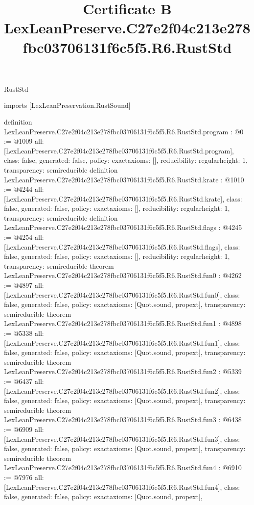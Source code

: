 \begin{lexlean}{RustStd}
\title{Certificate B LexLeanPreserve.C27e2f04c213e278fbc03706131f6c5f5.R6.RustStd}
\begin{coremodule}
imports [LexLeanPreservation.RustSound]

definition LexLeanPreserve.C27e2f04c213e278fbc03706131f6c5f5.R6.RustStd.program : @0 := @1009 {
  all: [LexLeanPreserve.C27e2f04c213e278fbc03706131f6c5f5.R6.RustStd.program],
  class: false,
  generated: false,
  policy: exact{axioms: []},
  reducibility: regular{height: 1},
  transparency: semireducible
}
definition LexLeanPreserve.C27e2f04c213e278fbc03706131f6c5f5.R6.RustStd.krate : @1010 := @4244 {
  all: [LexLeanPreserve.C27e2f04c213e278fbc03706131f6c5f5.R6.RustStd.krate],
  class: false,
  generated: false,
  policy: exact{axioms: []},
  reducibility: regular{height: 1},
  transparency: semireducible
}
definition LexLeanPreserve.C27e2f04c213e278fbc03706131f6c5f5.R6.RustStd.flags : @4245 := @4254 {
  all: [LexLeanPreserve.C27e2f04c213e278fbc03706131f6c5f5.R6.RustStd.flags],
  class: false,
  generated: false,
  policy: exact{axioms: []},
  reducibility: regular{height: 1},
  transparency: semireducible
}
theorem LexLeanPreserve.C27e2f04c213e278fbc03706131f6c5f5.R6.RustStd.fun0 : @4262 := @4897 {
  all: [LexLeanPreserve.C27e2f04c213e278fbc03706131f6c5f5.R6.RustStd.fun0],
  class: false,
  generated: false,
  policy: exact{axioms: [Quot.sound, propext]},
  transparency: semireducible
}
theorem LexLeanPreserve.C27e2f04c213e278fbc03706131f6c5f5.R6.RustStd.fun1 : @4898 := @5338 {
  all: [LexLeanPreserve.C27e2f04c213e278fbc03706131f6c5f5.R6.RustStd.fun1],
  class: false,
  generated: false,
  policy: exact{axioms: [Quot.sound, propext]},
  transparency: semireducible
}
theorem LexLeanPreserve.C27e2f04c213e278fbc03706131f6c5f5.R6.RustStd.fun2 : @5339 := @6437 {
  all: [LexLeanPreserve.C27e2f04c213e278fbc03706131f6c5f5.R6.RustStd.fun2],
  class: false,
  generated: false,
  policy: exact{axioms: [Quot.sound, propext]},
  transparency: semireducible
}
theorem LexLeanPreserve.C27e2f04c213e278fbc03706131f6c5f5.R6.RustStd.fun3 : @6438 := @6909 {
  all: [LexLeanPreserve.C27e2f04c213e278fbc03706131f6c5f5.R6.RustStd.fun3],
  class: false,
  generated: false,
  policy: exact{axioms: [Quot.sound, propext]},
  transparency: semireducible
}
theorem LexLeanPreserve.C27e2f04c213e278fbc03706131f6c5f5.R6.RustStd.fun4 : @6910 := @7976 {
  all: [LexLeanPreserve.C27e2f04c213e278fbc03706131f6c5f5.R6.RustStd.fun4],
  class: false,
  generated: false,
  policy: exact{axioms: [Quot.sound, propext]},
}
\end{coremodule}
\end{lexlean}
